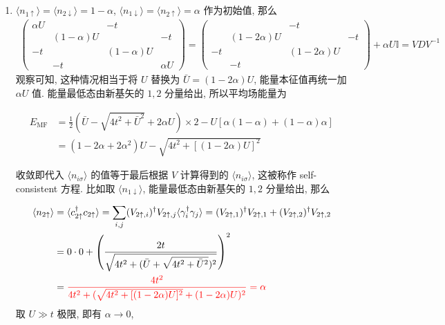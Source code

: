 \documentclass[../../main.tex]{subfiles}
\begin{document}
\begin{enumerate}
  \item $\langle n_{1\uparrow}\rangle = \langle n_{2\downarrow}\rangle = 1- \alpha$, $\langle n_{1\downarrow}\rangle = \langle n_{2\uparrow}\rangle = \alpha$ 作为初始值, 那么
  \begin{align*}
    \begin{pmatrix}
      \alpha U&  & -t & \\
      & (1-\alpha)U & & -t\\
      -t & & (1-\alpha)U &  \\
      & -t &  & \alpha U
    \end{pmatrix} = \begin{pmatrix}
       &  & -t & \\
      & (1-2\alpha)U & & -t\\
      -t & & (1-2\alpha)U &  \\
      & -t &  & 
    \end{pmatrix} + \alpha U\mathbb{I}= VDV^{-1}
  \end{align*}
  观察可知, 这种情况相当于将 $U$ 替换为 $\bar{U} = (1-2\alpha)U$, 能量本征值再统一加 $\alpha U$ 值. 能量最低态由新基矢的 $1,2$ 分量给出, 所以平均场能量为

  \begin{align*}
    E_{\text{MF}} &= \frac{1}{2}(\bar{U} - \sqrt{4t^{2} + \bar{U}^{2}} + 2\alpha U)\times 2 - U[\alpha(1-\alpha) + (1-\alpha)\alpha]\\
    &= (1-2\alpha + 2\alpha^{2})U - \sqrt{4t^{2} + [(1-2\alpha)U]^{2}}
  \end{align*}

  收敛即代入 $\langle n_{i\sigma}\rangle$ 的值等于最后根据 $V$ 计算得到的 $\langle n_{i\sigma}\rangle$, 这被称作 self-consistent 方程. 比如取 $\langle n_{1\downarrow}\rangle$, 能量最低态由新基矢的 $1,2$ 分量给出, 那么

  \begin{align*}
    \begin{aligned}
      \langle n_{2\uparrow}\rangle &= \langle c_{2\uparrow}^{\dagger}c_{2\uparrow}\rangle = \sum_{i,j}(V_{2\uparrow, i})^{\dagger}V_{2\uparrow,j}\langle\gamma_{i}^{\dagger}\gamma_{j}\rangle = (V_{2\uparrow, 1})^{\dagger}V_{2\uparrow,1} + (V_{2\uparrow, 2})^{\dagger}V_{2\uparrow,2}\\
    &= 0\cdot 0 + \left(\frac{2t}{\sqrt{4t^{2} + (\bar{U} + \sqrt{4t^{2} + \bar{U}^{2}})^{2}}}\right)^{2}  \\
    &= {\color{red}{\frac{4t^{2}}{4t^{2} + (\sqrt{4t^{2} + [(1-2\alpha)U]^{2}} + (1-2\alpha)U)^{2}} = \alpha}}
    \end{aligned}
  \end{align*}
  取 $U\gg t$ 极限, 即有 $\alpha\rightarrow 0$, 
\end{enumerate}
\end{document}
